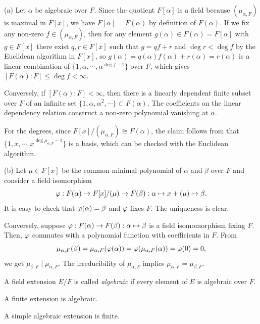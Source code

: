 \documentclass{../../large}
\begin{document}
\begin{pf}
(a)
Let $\alpha$ be algebraic over $F$.
Since the quotient $F[\alpha]$ is a field because $(\mu_{\alpha,F})$ is maximal in $F[x]$, we have $F[\alpha]=F(\alpha)$ by definition of $F(\alpha)$.
If we fix any non-zero $f\in(\mu_{\alpha,F})$, then for any element $g(\alpha)\in F(\alpha)=F[\alpha]$ with $g\in F[x]$ there exist $q,r\in F[x]$ such that $g=qf+r$ and $\deg r<\deg f$ by the Euclidean algorithm in $F[x]$, so $g(\alpha)=q(\alpha)f(\alpha)+r(\alpha)=r(\alpha)$ is a linear combination of $\{1,\alpha,\cdots,\alpha^{\deg f-1}\}$ over $F$, which gives $[F(\alpha):F]\le\deg f<\infty$.

Conversely, if $[F(\alpha):F]<\infty$, then there is a linearly dependent finite subset over $F$ of an infinite set $\{1,\alpha,\alpha^2,\cdots\}\subset F(\alpha)$.
The coefficients on the linear dependency relation construct a non-zero polynomial vanishing at $\alpha$.

For the degrees, since $F[x]/(\mu_{\alpha,F})\cong F(\alpha)$, the claim follows from that $\{1,x,\cdots,x^{\deg\mu_{\alpha,F}-1}\}$ is a basis, which can be checked with the Euclidean algorithm.

(b)
Let $\mu\in F[x]$ be the common minimal polynomial of $\alpha$ and $\beta$ over $F$ and consider a field isomorphism
\[\varphi:F(\alpha)\to F[x]/(\mu)\to F(\beta):\alpha\mapsto x+(\mu)\mapsto\beta.\]
It is easy to check that $\varphi(\alpha)=\beta$ and $\varphi$ fixes $F$.
The uniqueness is clear.

Conversely, suppose $\varphi:F(\alpha)\to F(\beta):\alpha\mapsto\beta$ is a field isomomorphism fixing $F$.
Then, $\varphi$ commutes with a polynomial function with coefficients in $F$.
From
\[\mu_{\alpha,F}(\beta)=\mu_{\alpha,F}(\varphi(\alpha))=\varphi(\mu_{\alpha,F}(\alpha))=\varphi(0)=0,\]
we get $\mu_{\beta,F}\mid\mu_{\alpha,F}$.
The irreducibility of $\mu_{\alpha,F}$ implies $\mu_{\alpha,F}=\mu_{\beta,F}$.
\end{pf}

\begin{prb}
A field extension $E/F$ is called \emph{algebraic} if every element of $E$ is algebraic over $F$.
\begin{parts}
\item A finite extension is algebraic.
\item A simple algebraic extension is finite.
\end{parts}
\end{prb}
\end{document}
